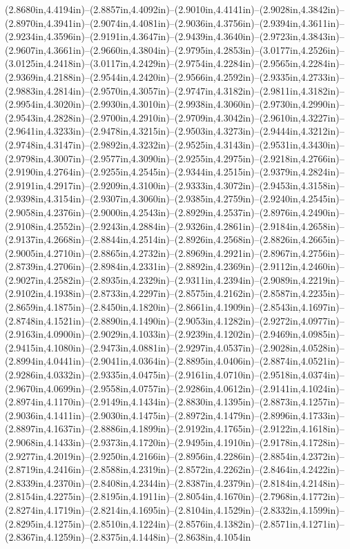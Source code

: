 (2.8680in,4.4194in)--(2.8857in,4.4092in)--(2.9010in,4.4141in)--(2.9028in,4.3842in)--(2.8970in,4.3941in)--(2.9074in,4.4081in)--(2.9036in,4.3756in)--(2.9394in,4.3611in)--(2.9234in,4.3596in)--(2.9191in,4.3647in)--(2.9439in,4.3640in)--(2.9723in,4.3843in)--(2.9607in,4.3661in)--(2.9660in,4.3804in)--(2.9795in,4.2853in)--(3.0177in,4.2526in)--(3.0125in,4.2418in)--(3.0117in,4.2429in)--(2.9754in,4.2284in)--(2.9565in,4.2284in)--(2.9369in,4.2188in)--(2.9544in,4.2420in)--(2.9566in,4.2592in)--(2.9335in,4.2733in)--(2.9883in,4.2814in)--(2.9570in,4.3057in)--(2.9747in,4.3182in)--(2.9811in,4.3182in)--(2.9954in,4.3020in)--(2.9930in,4.3010in)--(2.9938in,4.3060in)--(2.9730in,4.2990in)--(2.9543in,4.2828in)--(2.9700in,4.2910in)--(2.9709in,4.3042in)--(2.9610in,4.3227in)--(2.9641in,4.3233in)--(2.9478in,4.3215in)--(2.9503in,4.3273in)--(2.9444in,4.3212in)--(2.9748in,4.3147in)--(2.9892in,4.3232in)--(2.9525in,4.3143in)--(2.9531in,4.3430in)--(2.9798in,4.3007in)--(2.9577in,4.3090in)--(2.9255in,4.2975in)--(2.9218in,4.2766in)--(2.9190in,4.2764in)--(2.9255in,4.2545in)--(2.9344in,4.2515in)--(2.9379in,4.2824in)--(2.9191in,4.2917in)--(2.9209in,4.3100in)--(2.9333in,4.3072in)--(2.9453in,4.3158in)--(2.9398in,4.3154in)--(2.9307in,4.3060in)--(2.9385in,4.2759in)--(2.9240in,4.2545in)--(2.9058in,4.2376in)--(2.9000in,4.2543in)--(2.8929in,4.2537in)--(2.8976in,4.2490in)--(2.9108in,4.2552in)--(2.9243in,4.2884in)--(2.9326in,4.2861in)--(2.9184in,4.2658in)--(2.9137in,4.2668in)--(2.8844in,4.2514in)--(2.8926in,4.2568in)--(2.8826in,4.2665in)--(2.9005in,4.2710in)--(2.8865in,4.2732in)--(2.8969in,4.2921in)--(2.8967in,4.2756in)--(2.8739in,4.2706in)--(2.8984in,4.2331in)--(2.8892in,4.2369in)--(2.9112in,4.2460in)--(2.9027in,4.2582in)--(2.8935in,4.2329in)--(2.9311in,4.2394in)--(2.9089in,4.2219in)--(2.9102in,4.1938in)--(2.8733in,4.2297in)--(2.8575in,4.2162in)--(2.8587in,4.2235in)--(2.8659in,4.1875in)--(2.8450in,4.1820in)--(2.8661in,4.1909in)--(2.8543in,4.1697in)--(2.8748in,4.1521in)--(2.8890in,4.1490in)--(2.9053in,4.1282in)--(2.9272in,4.0977in)--(2.9163in,4.0900in)--(2.9029in,4.1033in)--(2.9239in,4.1202in)--(2.9469in,4.0985in)--(2.9415in,4.1080in)--(2.9473in,4.0881in)--(2.9297in,4.0537in)--(2.9028in,4.0528in)--(2.8994in,4.0441in)--(2.9041in,4.0364in)--(2.8895in,4.0406in)--(2.8874in,4.0521in)--(2.9286in,4.0332in)--(2.9335in,4.0475in)--(2.9161in,4.0710in)--(2.9518in,4.0374in)--(2.9670in,4.0699in)--(2.9558in,4.0757in)--(2.9286in,4.0612in)--(2.9141in,4.1024in)--(2.8974in,4.1170in)--(2.9149in,4.1434in)--(2.8830in,4.1395in)--(2.8873in,4.1257in)--(2.9036in,4.1411in)--(2.9030in,4.1475in)--(2.8972in,4.1479in)--(2.8996in,4.1733in)--(2.8897in,4.1637in)--(2.8886in,4.1899in)--(2.9192in,4.1765in)--(2.9122in,4.1618in)--(2.9068in,4.1433in)--(2.9373in,4.1720in)--(2.9495in,4.1910in)--(2.9178in,4.1728in)--(2.9277in,4.2019in)--(2.9250in,4.2166in)--(2.8956in,4.2286in)--(2.8854in,4.2372in)--(2.8719in,4.2416in)--(2.8588in,4.2319in)--(2.8572in,4.2262in)--(2.8464in,4.2422in)--(2.8339in,4.2370in)--(2.8408in,4.2344in)--(2.8387in,4.2379in)--(2.8184in,4.2148in)--(2.8154in,4.2275in)--(2.8195in,4.1911in)--(2.8054in,4.1670in)--(2.7968in,4.1772in)--(2.8274in,4.1719in)--(2.8214in,4.1695in)--(2.8104in,4.1529in)--(2.8332in,4.1599in)--(2.8295in,4.1275in)--(2.8510in,4.1224in)--(2.8576in,4.1382in)--(2.8571in,4.1271in)--(2.8367in,4.1259in)--(2.8375in,4.1448in)--(2.8638in,4.1054in